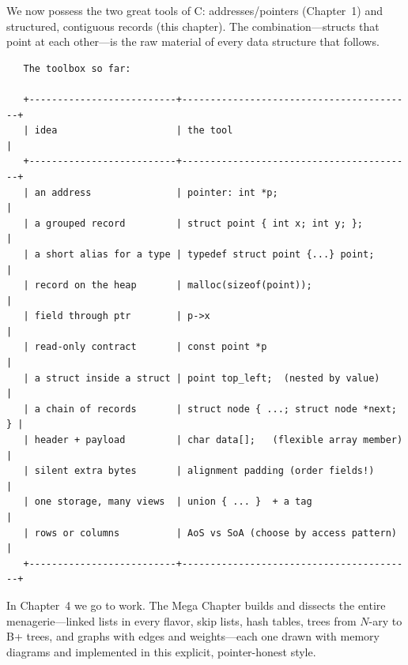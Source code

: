 We now possess the two great tools of C: addresses/pointers
(Chapter~1) and structured, contiguous records (this chapter). The
combination---structs that point at each other---is the raw material of
every data structure that follows.

\begin{verbatim}
   The toolbox so far:

   +--------------------------+-----------------------------------------+
   | idea                     | the tool                                |
   +--------------------------+-----------------------------------------+
   | an address               | pointer: int *p;                        |
   | a grouped record         | struct point { int x; int y; };         |
   | a short alias for a type | typedef struct point {...} point;       |
   | record on the heap       | malloc(sizeof(point));                  |
   | field through ptr        | p->x                                    |
   | read-only contract       | const point *p                          |
   | a struct inside a struct | point top_left;  (nested by value)      |
   | a chain of records       | struct node { ...; struct node *next; } |
   | header + payload         | char data[];   (flexible array member)  |
   | silent extra bytes       | alignment padding (order fields!)       |
   | one storage, many views  | union { ... }  + a tag                  |
   | rows or columns          | AoS vs SoA (choose by access pattern)   |
   +--------------------------+-----------------------------------------+
\end{verbatim}

In Chapter~4 we go to work. The Mega Chapter builds and dissects the
entire menagerie---linked lists in every flavor, skip lists, hash
tables, trees from $N$-ary to B+ trees, and graphs with edges and
weights---each one drawn with memory diagrams and implemented in this
explicit, pointer-honest style.
